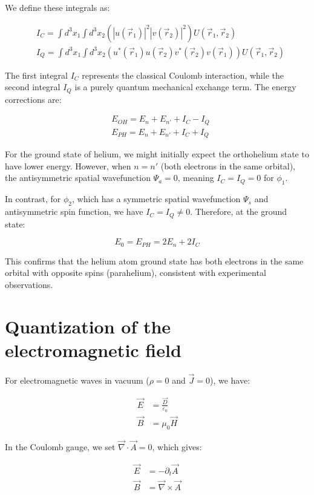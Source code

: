\documentclass[italian]{HKNdocument}
\begin{document}
We define these integrals as:

\begin{align}
&I_C=\int d^3x_1\int d^3x_2(|u(\vec{r}_1)|^2|v(\vec{r}_2)|^2)U(\vec{r}_1,\vec{r}_2)\\
&I_Q=\int d^3x_1\int d^3x_2(u^*(\vec{r}_1)u(\vec{r}_2)v^*(\vec{r}_2)v(\vec{r}_1))U(\vec{r}_1,\vec{r}_2) \label{eq:14.45}
\end{align}

The first integral $I_C$ represents the classical Coulomb interaction, while the second integral $I_Q$ is a purely quantum mechanical exchange term. The energy corrections are:

\begin{align}
&E_{OH}=E_n+E_{n'}+I_C-I_Q\\
&E_{PH}=E_n+E_{n'}+I_C+I_Q \label{eq:14.46}
\end{align}


For the ground state of helium, we might initially expect the orthohelium state to have lower energy. However, when $n=n'$ (both electrons in the same orbital), the antisymmetric spatial wavefunction $\Psi_a=0$, meaning $I_C=I_Q=0$ for $\phi_1$.

In contrast, for $\phi_2$, which has a symmetric spatial wavefunction $\Psi_s$ and antisymmetric spin function, we have $I_C=I_Q\neq 0$. Therefore, at the ground state:

\begin{equation}
E_0=E_{PH}=2E_n+2I_C \label{eq:14.47}
\end{equation}

This confirms that the helium atom ground state has both electrons in the same orbital with opposite spins (parahelium), consistent with experimental observations.

\section{Quantization of the electromagnetic field}
For electromagnetic waves in vacuum ($\rho=0$ and $\vec{J}=0$), we have:

\begin{align}
\vec{E}&=\frac{\vec{D}}{\varepsilon_0} \label{eq:15.1}\\
\vec{B}&=\mu_0\vec{H}
\end{align}

In the Coulomb gauge, we set $\vec{\nabla}\cdot\vec{A}=0$, which gives:

\begin{align}
\vec{E}&=-\partial_t\vec{A}\\
\vec{B}&=\vec{\nabla}\times\vec{A} \label{eq:15.2}
\end{align}
\end{document}
